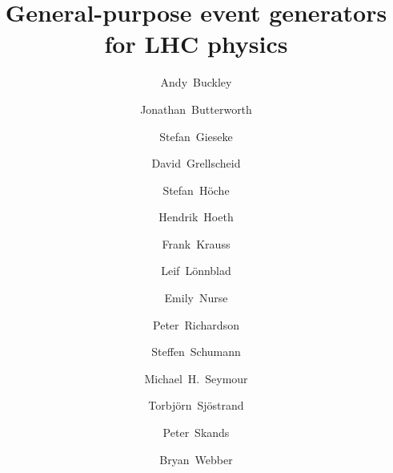 \documentclass[preprint,12pt]{elsarticle}
\begin{document}

\begin{frontmatter}



\title{General-purpose event generators for LHC physics}


\author[Edinburgh]{Andy~Buckley}
\author[UCL]{Jonathan~Butterworth}
\author[Karlsruhe]{Stefan~Gieseke}
\author[Durham]{David~Grellscheid}
\author[SLAC]{Stefan~H{\"o}che}
\author[Durham]{Hendrik~Hoeth}
\author[Durham]{Frank~Krauss}
\author[Lund,CERN]{Leif~Lönnblad}
\author[UCL]{Emily~Nurse}
\author[Durham]{Peter~Richardson}
\author[Heidelberg]{Steffen~Schumann}
\author[Manchester]{Michael~H.~Seymour}
\author[Lund]{Torbjörn~Sjöstrand}
\author[CERN]{Peter~Skands}
\author[Cambridge]{Bryan~Webber}

\address[Edinburgh]{PPE Group, School of Physics \& Astronomy, University of Edinburgh, EH25 9PN, UK}
\address[UCL]{Department of Physics \& Astronomy, University College London, WC1E 6BT, UK}
\address[Karlsruhe]{Institute for Theoretical Physics, Karlsruhe Institute of Technology, D-76128 Karlsruhe}
\address[Durham]{Institute for Particle Physics Phenomenology, Durham University, DH1 3LE, UK}
\address[SLAC]{SLAC National Accelerator Laboratory, Menlo Park, CA 94025, USA}
\address[Lund]{Department of Astronomy and Theoretical Physics, Lund University, Sweden}
\address[CERN]{PH Department, TH Unit, CERN, CH-1211 Geneva 23, Switzerland}
\address[Heidelberg]{Institute for Theoretical Physics, University of Heidelberg, 69120 Heidelberg, Germany}
\address[Manchester]{School of Physics and Astronomy, University of Manchester, M13 9PL, UK}
\address[Cambridge]{Cavendish Laboratory, J.J.~Thomson Avenue, Cambridge CB3 0HE, UK}


\end{frontmatter}
\end{document}
